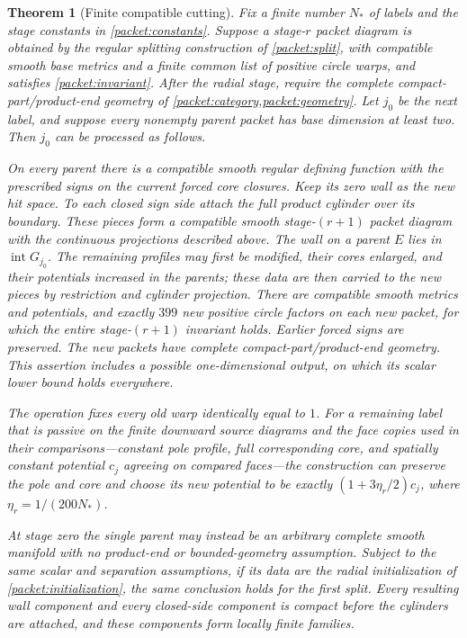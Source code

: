 \documentclass[11pt]{article}
\numberwithin{equation}{section}
\newtheorem{theorem}{Theorem}[section]
\theoremstyle{definition}
\theoremstyle{remark}
\begin{document}
\begin{theorem}[Finite compatible cutting]\label{finite:cut}
Fix a finite number $N_*$ of labels and the stage constants in
\eqref{packet:constants}. Suppose a stage-$r$ packet diagram is obtained by
the regular splitting construction of \cref{packet:split}, with compatible
smooth base metrics and a finite common list of positive circle warps,
and satisfies \cref{packet:invariant}. After the radial stage, require the
complete compact-part/product-end geometry of \cref{packet:category,packet:geometry}.
Let $j_0$ be the next label, and suppose every nonempty parent packet has
base dimension at least two. Then $j_0$ can be processed as follows.

On every parent there is a compatible smooth regular defining function
with the prescribed signs on the current forced core closures. Keep its
zero wall as the new hit space. To each closed sign side attach the full
product cylinder over its boundary. These pieces form a compatible smooth
stage-$(r+1)$ packet diagram with the continuous projections described
above. The wall on a parent $E$ lies in $\operatorname{int}G_{j_0}$.
The remaining profiles may first be modified, their cores enlarged,
and their potentials increased in the parents; these data are then carried to the new pieces by restriction and cylinder projection.
There are compatible smooth metrics and potentials, and exactly $399$
new positive circle factors on each new packet, for which the entire
stage-$(r+1)$ invariant holds. Earlier forced signs are preserved.
The new packets have complete compact-part/product-end geometry. This
assertion includes a possible one-dimensional output, on which its scalar
lower bound holds everywhere.

The operation fixes every old warp identically equal to $1$. For a
remaining label that is passive on the finite downward source diagrams
and the face copies used in their comparisons---constant pole profile, full corresponding core, and spatially
constant potential $c_j$ agreeing on compared faces---the construction
can preserve the pole and core and choose its new potential to be exactly
$(1+3\eta_r/2)c_j$, where $\eta_r=1/(200N_*)$.

At stage zero the single parent may instead be an arbitrary complete
smooth manifold with no product-end or bounded-geometry assumption. Subject to the same scalar and separation assumptions, if its
data are the radial initialization of \cref{packet:initialization}, the
same conclusion holds for the first split. Every resulting wall component and every closed-side component is compact before the cylinders are attached, and these components form locally finite
families.
\end{theorem}
\end{document}
